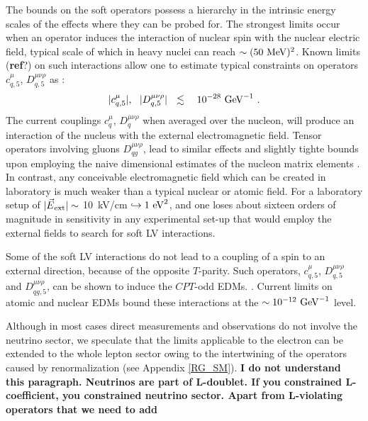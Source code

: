 \documentclass[12pt,preprintnumbers,nofootinbib]{revtex4}
\begin{document}
	The bounds on the soft operators possess a hierarchy in the 
	intrinsic energy scales of the effects where they can be probed for.
	The strongest limits occur when an operator induces the interaction 
	of nuclear spin with the nuclear electric field, typical scale of which
	in heavy nuclei can reach $ \sim (50~{\rm MeV})^2 $.
	Known limits ({\bf ref}?) on such interactions allow one to estimate typical constraints on operators 
$ c^\mu_{q,5} $, $ D^{\mu\nu\rho}_{q,5} $ as
\cite{Bolokhov:2005cj}:
\begin{equation}
\label{nucl_spin}
	|c^\mu_{q,5}|,~~ |D^{\mu\nu\rho}_{q,5}| ~~\lesssim~~~
	10^{-28}~{\rm GeV}^{-1}~.
\end{equation}
	The current couplings $ c_q^\mu $, $ D^{\mu\nu\rho}_q $  when averaged over the nucleon, 
	will produce an interaction of the nucleus with the external electromagnetic field.
	Tensor operators
	involving gluons $ D^{\mu\nu\rho}_{qg} $, lead to similar effects and slightly tighte bounds upon 
	employing the naive dimensional estimates of the nucleon matrix elements
\cite{Manohar:1983md}.
	In contrast, any conceivable electromagnetic field which can be created in laboratory
	is much weaker than a typical nuclear or atomic field.
	For a laboratory setup of $ |\vec{E}{}_{\rm ext}| \sim $ 10~kV/cm 
	$ \hookrightarrow 1~{\rm eV}^2 $, 
	and one loses about sixteen orders of magnitude in sensitivity in any experimental set-up that 
would employ the external fields to search for soft LV interactions.
	
	Some of the soft LV interactions do not lead to a coupling of a spin to an external direction, 
because of the opposite $T$-parity.   Such operators, $ c^\mu_{q,5} $, $ D^{\mu\nu\rho}_{q,5} $ and
	$ D^{\mu\nu\rho}_{qg,5} $,  can be shown to induce the $CPT$-odd EDMs.
\cite{Bolokhov_EDM}.
	Current limits on atomic and nuclear EDMs bound these interactions
	at the $ \sim 10^{-12}~{\rm GeV}^{-1} $ 
	level.
	

	Although in most cases direct measurements and observations do not involve 
	the neutrino sector, 
	we speculate that the limits applicable to the electron can be extended to
	the whole lepton sector owing to the intertwining of the operators caused by
	renormalization (see Appendix \ref{RG_SM}).
	{\bf I do not understand this paragraph. Neutrinos are part of L-doublet. If you constrained 
	L-coefficient, you constrained neutrino sector. Apart from L-violating operators that 
	we need to add}
\end{document}
